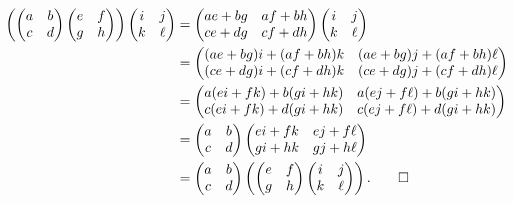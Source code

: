 \begin{sol}
    \begin{align*}
        \left(
        \begin{pmatrix}
            a & b \\
            c & d
        \end{pmatrix}
        \begin{pmatrix}
            e & f \\
            g & h
        \end{pmatrix}
        \right)
        \begin{pmatrix}
            i & j \\
            k & \ell
        \end{pmatrix}
        &=
        \begin{pmatrix}
            ae + bg & af + bh \\
            ce + dg & cf + dh
        \end{pmatrix}
        \begin{pmatrix}
            i & j \\
            k & \ell
        \end{pmatrix} \\
        &= 
        \begin{pmatrix}
            (ae + bg)i + (af + bh)k & (ae + bg)j + (af + bh)\ell \\
            (ce + dg)i + (cf + dh)k & (ce + dg)j + (cf + dh)\ell
        \end{pmatrix} \\
        &= 
        \begin{pmatrix}
            a(ei + fk) + b(gi + hk) & a(ej + f\ell) + b(gi + hk) \\
            c(ei + fk) + d(gi + hk) & c(ej + f\ell) + d(gi + hk)
        \end{pmatrix} \\
        &=
        \begin{pmatrix}
            a & b \\
            c & d
        \end{pmatrix}
        \begin{pmatrix}
            ei + fk & ej + f\ell \\
            gi + hk & gj + h\ell
        \end{pmatrix} \\
        &=
        \begin{pmatrix}
            a & b \\
            c & d
        \end{pmatrix}
        \left(
        \begin{pmatrix}
            e & f \\
            g & h
        \end{pmatrix}
        \begin{pmatrix}
            i & j \\
            k & \ell
        \end{pmatrix}
        \right). \qedhere
    \end{align*}
\end{sol}

